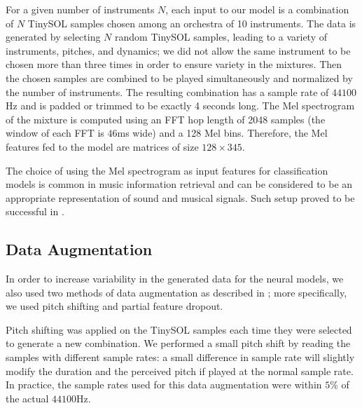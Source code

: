 \documentclass[runningheads,a4paper]{llncs}
\begin{document}

For a given number of instruments $N$, each input to our model is a combination of $N$ TinySOL samples chosen among an orchestra of 10 instruments. The data is generated by selecting $N$ random TinySOL samples, leading to a variety of instruments, pitches, and dynamics; we did not allow the same instrument to be chosen more than three times in order to ensure variety in the mixtures. Then the chosen samples are combined to be played simultaneously and normalized by the number of instruments. The resulting combination has a sample rate of $44100$Hz and is padded or trimmed to be exactly 4 seconds long. The Mel spectrogram of the mixture is computed using an FFT hop length of 2048 samples (the window of each FFT is $46$ms wide) and a 128 Mel bins. Therefore, the Mel features fed to the model are matrices of size $128\times 345$.

The choice of using the Mel spectrogram as input features for classification models is common in music information retrieval \cite{McKinney2003} and can be considered to be an appropriate representation of sound and musical signals. %
Such setup proved to be successful in \cite{Salamon17}.


\subsection{Data Augmentation}

In order to increase variability in the generated data for the neural models, we also used two methods of data augmentation as described in \cite{Salamon17, Bhardwaj17}; more specifically, we used pitch shifting and partial feature dropout.

Pitch shifting was applied on the TinySOL samples each time they were selected to generate a new combination. We performed a small pitch shift by reading the samples with different sample rates: a small difference in sample rate will slightly modify the duration and the perceived pitch if played at the normal sample rate. In practice, the sample rates used for this data augmentation were within $5\%$ of the actual $44100$Hz.
\end{document}
